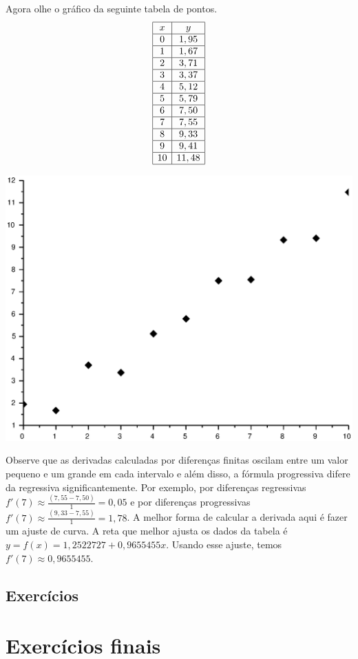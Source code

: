 Agora olhe o gráfico da seguinte tabela de pontos.
$$
\begin{array}{|c|c|}
\hline
x&y\\
\hline
0    & 1,95  \\
\hline
    1&     1,67  \\
		\hline
    2 &    3,71  \\
		\hline
    3  &   3,37  \\
		\hline
    4   &  5,12   \\
		\hline
    5&     5,79  \\
		\hline
    6 &    7,50  \\
		\hline
    7  &   7,55  \\
		\hline
    8   &  9,33  \\
		\hline
    9   &  9,41   \\
		\hline
    10  &  11,48  \\
		\hline
\end{array}
$$
\begin{center}
\includegraphics[scale=0.5]{./cap_derivacao/pics/graf_der.eps}
\end{center}

Observe que as derivadas calculadas por diferenças finitas oscilam entre um valor pequeno e um grande em cada intervalo e além disso, a fórmula progressiva difere da regressiva significantemente. Por exemplo, por diferenças regressivas $f'(7)\approx \frac{(7,55 -  7,50)}{1}=0,05$ e por diferenças progressivas $f'(7)\approx \frac{(9,33 -  7,55)}{1}=1,78$. A melhor forma de calcular a derivada aqui é fazer um ajuste de curva. A reta que melhor ajusta os dados da tabela é $y=f(x)=1,2522727+0,9655455x$. Usando esse ajuste, temos $f'(7)\approx 0,9655455$.

\subsection{Exercícios}

\emconstrucao


\section{Exercícios finais}

\emconstrucao

% 
